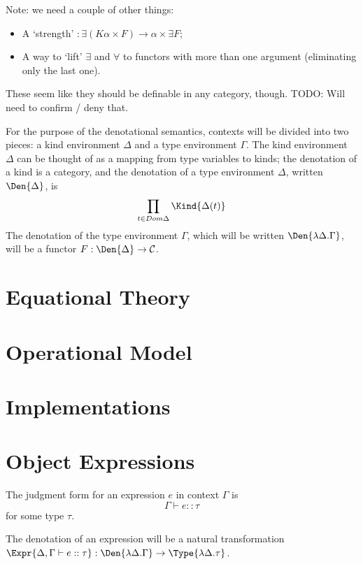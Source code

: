 \documentclass{report}
\newcommand\sequent\vdash
\begin{document}
Note: we need a couple of other things:
\begin{itemize}
    \item A `strength' $: \exists (K\alpha \times F) \to \alpha \times \exists F$;
    \item A way to `lift' $\exists$ and $\forall$ to functors with more than one argument (eliminating only the last one).
\end{itemize}
These seem like they should be definable in any category, though.
TODO: Will need to confirm / deny that.

For the purpose of the denotational semantics, contexts will be divided into two pieces:
a kind environment $\Delta$ and a type environment $\Gamma$.
The kind environment $\Delta$ can be thought of as a mapping from type variables to kinds;
the denotation of a kind is a category, and the denotation of a type environment $\Delta$, written $\Den{\Delta}$, is
\begin{displaymath}
    \prod_{t\in Dom\Delta}\Kind{\Delta(t)}
\end{displaymath}
The denotation of the type environment $\Gamma$, which will be written $\Den{\lambda\Delta.\Gamma}$, will be a functor $F : \Den{\Delta} \to \mathcal{C}$.

\chapter{Equational Theory}

\chapter{Operational Model}

\chapter{Implementations}

\chapter{Object Expressions}

The judgment form for an expression $e$ in context $\Gamma$ is
\begin{equation}
    \Gamma \sequent e :: \tau
\end{equation}
for some type $\tau$.

The denotation of an expression will be a natural transformation $\Expr{\Delta, \Gamma \sequent e :: \tau} : \Den{\lambda\Delta.\Gamma} \to \Type{\lambda\Delta.\tau}$.
\end{document}
